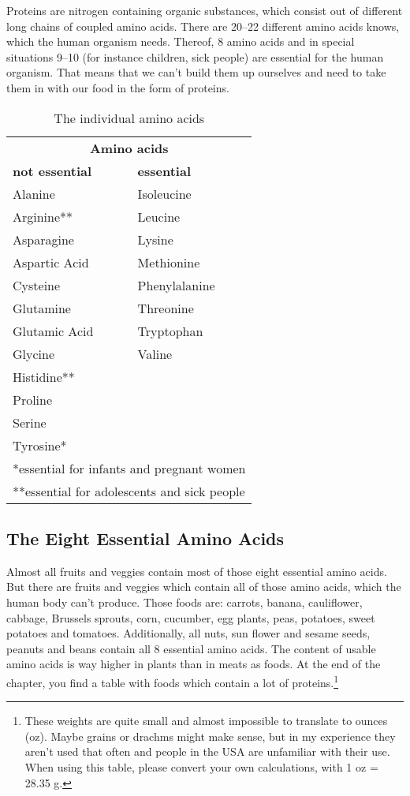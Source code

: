 \documentclass[../main.tex]{subfiles}
\begin{document}
  Proteins are nitrogen containing organic substances, which consist out of different long chains of coupled amino acids.
  There are 20--22 different amino acids knows, which the human organism needs.
  Thereof, 8 amino acids and in special situations 9--10 (for instance children, sick people) are essential for the human organism.
  That means that we can't build them up ourselves and need to take them in with our food in the form of proteins.

  \begin{table}[htb!]
    \centering
    \begin{tabular}{l|l}
      \multicolumn{2}{c}{\textbf{Amino acids}} \\
      \textbf{not essential} & \textbf{essential} \\
      \hline
      Alanine & Isoleucine \\
      Arginine** & Leucine \\
      Asparagine & Lysine \\
      Aspartic Acid & Methionine \\
      Cysteine & Phenylalanine \\
      Glutamine & Threonine \\
      Glutamic Acid & Tryptophan \\
      Glycine & Valine \\
      Histidine**\\
      Proline\\
      Serine\\
      Tyrosine*\\
      \hline
      \multicolumn{2}{l}{\footnotesize{*essential for infants and pregnant women}}\\
      \multicolumn{2}{l}{\footnotesize{**essential for adolescents and sick people}}
    \end{tabular}
    \caption{The individual amino acids}
  \end{table}

  \subsection{The Eight Essential Amino Acids}

  Almost all fruits and veggies contain most of those eight essential amino acids.
  But there are fruits and veggies which contain all of those amino acids, which the human body can't produce.
  Those foods are: carrots, banana, cauliflower, cabbage, Brussels sprouts, corn, cucumber, egg plants, peas, potatoes, sweet potatoes and tomatoes.
  Additionally, all nuts, sun flower and sesame seeds, peanuts and beans contain all 8 essential amino acids.
  The content of usable amino acids is way higher in plants than in meats as foods.
  At the end of the chapter, you find a table with foods which contain a lot of proteins.\footnote{These weights are
    quite small and almost impossible to translate to ounces (oz). Maybe grains or drachms might make sense, but in my experience they aren't used that often
    and people in the USA are unfamiliar with their use. When using this table, please convert your own calculations, with 1 oz = 28.35 g.}
  
\end{document}
